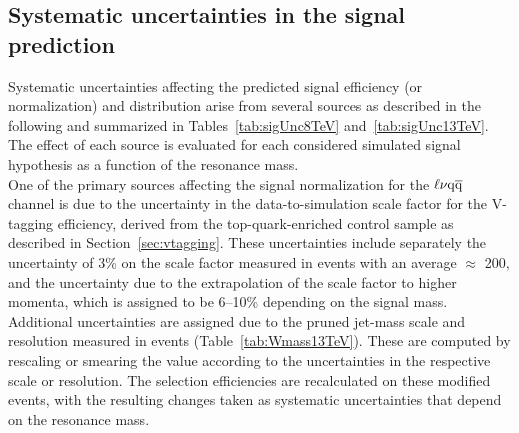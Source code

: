 \subsection{Systematic uncertainties in the signal prediction}\label{subsec:uncSig}

Systematic uncertainties affecting the predicted signal efficiency (or normalization) and \mlvj distribution arise from several sources as described in the following and summarized in Tables~\ref{tab:sigUnc8TeV} and~\ref{tab:sigUnc13TeV}.
The effect of each source is evaluated for each considered simulated signal hypothesis as a function of the resonance mass.\\

One of the primary sources affecting the signal normalization for the $\ell\nu\mathrm{q}\overline{\mathrm{q}}$ channel is due to the uncertainty in the data-to-simulation scale factor for the V-tagging efficiency, derived from the top-quark-enriched control sample as described in Section~\ref{sec:vtagging}. These uncertainties include separately the uncertainty of 3\% on the scale factor measured in \ttbar events with an average \pt $\approx$ 200\GeV, and the uncertainty due to the extrapolation of the scale factor to higher momenta, which is assigned to be 6--10\% depending on the signal mass. Additional uncertainties are assigned due to the pruned jet-mass scale and resolution measured in \ttbar events (Table~\ref{tab:Wmass13TeV}). These are computed by rescaling or smearing the \mJ value according to the uncertainties in the respective \mJ scale or resolution. The selection efficiencies are recalculated on these modified events, with the resulting changes taken as systematic uncertainties that depend on the resonance mass.


